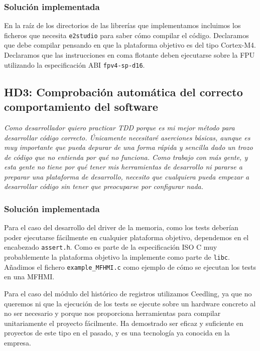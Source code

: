 \subsubsection{Solución implementada}

En la raíz de los directorios de las librerías que implementamos
incluimos los ficheros que necesita \texttt{e2studio} para
saber cómo compilar el código. Declaramos que debe compilar
pensando en que la plataforma objetivo es del tipo Cortex-M4.
Declaramos que las instrucciones en coma flotante deben ejecutarse
sobre la FPU utilizando la especificación ABI \texttt{fpv4-sp-d16}.

\subsection{HD3: Comprobación automática del correcto comportamiento del software}

\textit{Como desarrollador quiero practicar TDD porque es mi mejor
método para desarrollar código correcto. Únicamente necesitaré
aserciones básicas, aunque es muy importante que pueda depurar
de una forma rápida y sencilla dado un trozo de código
que no entienda por qué no funciona. Como trabajo con más gente,
y esta gente no tiene por qué tener mis herramientas de desarrollo
ni pararse a preparar una plataforma de desarrollo, necesito que
cualquiera pueda empezar a desarrollar código sin tener que preocuparse
por configurar nada.}

\subsubsection{Solución implementada}

Para el caso del desarrollo del driver de la memoria, como los tests
deberían poder ejecutarse fácilmente en cualquier plataforma objetivo,
dependemos en el encabezado \texttt{assert.h}. Como es parte de la
especificación ISO C muy probablemente la plataforma objetivo
la implemente como parte de \texttt{libc}. Añadimos el fichero
\texttt{example\_MFHMI.c} como ejemplo de cómo se ejecutan los tests
en una MFHMI.

Para el caso del módulo del histórico de registros utilizamos
Ceedling, ya que no queremos ni que la ejecución de los tests
se ejecute sobre un hardware concreto al no ser necesario y
porque nos proporciona herramientas para compilar unitariamente
el proyecto fácilmente. Ha demostrado ser eficaz y suficiente
en proyectos de este tipo en el pasado, y es una tecnología ya
conocida en la empresa.

